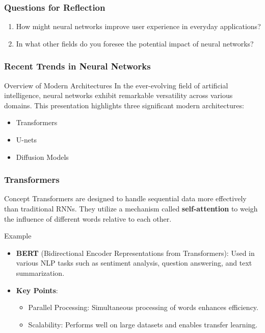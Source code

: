 \documentclass[aspectratio=169]{beamer}
\begin{document}
\begin{frame}[fragile]
    \frametitle{Questions for Reflection}
    \begin{enumerate}
        \item How might neural networks improve user experience in everyday applications?
        \item In what other fields do you foresee the potential impact of neural networks?
    \end{enumerate}
\end{frame}

\begin{frame}[fragile]
  \frametitle{Recent Trends in Neural Networks}
  \begin{block}{Overview of Modern Architectures}
    In the ever-evolving field of artificial intelligence, neural networks exhibit remarkable versatility across various domains. This presentation highlights three significant modern architectures:
  \end{block}
  \begin{itemize}
    \item Transformers
    \item U-nets
    \item Diffusion Models
  \end{itemize}
\end{frame}

\begin{frame}[fragile]
  \frametitle{Transformers}
  \begin{block}{Concept}
    Transformers are designed to handle sequential data more effectively than traditional RNNs. They utilize a mechanism called \textbf{self-attention} to weigh the influence of different words relative to each other.
  \end{block}
  \begin{block}{Example}
    \begin{itemize}
      \item \textbf{BERT} (Bidirectional Encoder Representations from Transformers): Used in various NLP tasks such as sentiment analysis, question answering, and text summarization.
    \end{itemize}
  \end{block}
  \begin{itemize}
    \item \textbf{Key Points}:
    \begin{itemize}
      \item Parallel Processing: Simultaneous processing of words enhances efficiency.
      \item Scalability: Performs well on large datasets and enables transfer learning.
    \end{itemize}
  \end{itemize}
\end{frame}
\end{document}
